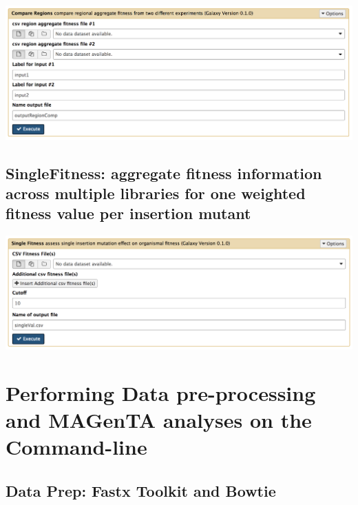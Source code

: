 \documentclass[11pt,]{article}
\begin{document}
\centerline{\includegraphics[width=0.8\linewidth]{figs/compareRegions_galaxy.png}}

\subsection{SingleFitness: aggregate fitness information across multiple
libraries for one weighted fitness value per insertion
mutant}\label{singlefitness-aggregate-fitness-information-across-multiple-libraries-for-one-weighted-fitness-value-per-insertion-mutant}

\centerline{\includegraphics[width=0.8\linewidth]{figs/singleFitness_galaxy.png}}

\section{Performing Data pre-processing and MAGenTA analyses on the
Command-line}\label{performing-data-pre-processing-and-magenta-analyses-on-the-command-line}

\subsection{Data Prep: Fastx Toolkit and
Bowtie}\label{data-prep-fastx-toolkit-and-bowtie}
\end{document}
